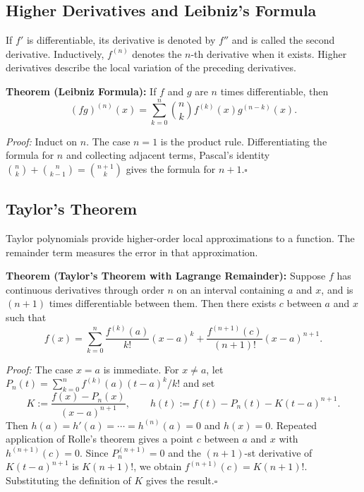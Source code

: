 \documentclass[a4paper,11pt,abstracton]{scrartcl}
\theoremstyle{dotlessP}
\theoremstyle{dotlessS}
\theoremstyle{remark}
\theoremstyle{definition}
\begin{document}
\subsection{Higher Derivatives and Leibniz's Formula}

If $f'$ is differentiable, its derivative is denoted by $f''$ and is
called the second derivative. Inductively, $f^{(n)}$ denotes the
$n$-th derivative when it exists. Higher derivatives describe the
local variation of the preceding derivatives.

\begin{problem_box}
\textbf{Theorem (Leibniz Formula):} If $f$ and $g$ are $n$ times
differentiable, then
\[
 (fg)^{(n)}(x)=\sum_{k=0}^n\binom nk
 f^{(k)}(x)g^{(n-k)}(x).
\]
\end{problem_box}

\begin{claim_box}
\textit{Proof:} Induct on $n$. The case $n=1$ is the product rule.
Differentiating the formula for $n$ and collecting adjacent terms,
Pascal's identity
$\binom nk+\binom n{k-1}=\binom{n+1}k$ gives the formula for
$n+1$.\hfill$\square$
\end{claim_box}

\subsection{Taylor's Theorem}

Taylor polynomials provide higher-order local approximations to a
function. The remainder term measures the error in that approximation.

\begin{problem_box}
\textbf{Theorem (Taylor's Theorem with Lagrange Remainder):}
Suppose $f$ has continuous derivatives through order $n$ on an
interval containing $a$ and $x$, and is $(n+1)$ times differentiable
between them. Then there exists $c$ between $a$ and $x$ such that
\[
 f(x)=\sum_{k=0}^{n}\frac{f^{(k)}(a)}{k!}(x-a)^k
 +\frac{f^{(n+1)}(c)}{(n+1)!}(x-a)^{n+1}.
\]
\end{problem_box}

\begin{claim_box}
\textit{Proof:} The case $x=a$ is immediate. For $x\ne a$, let
$P_n(t)=\sum_{k=0}^n f^{(k)}(a)(t-a)^k/k!$ and set
\[
 K:=\frac{f(x)-P_n(x)}{(x-a)^{n+1}},\qquad
 h(t):=f(t)-P_n(t)-K(t-a)^{n+1}.
\]
Then $h(a)=h'(a)=\cdots=h^{(n)}(a)=0$ and $h(x)=0$.
Repeated application of Rolle's theorem gives a point $c$ between
$a$ and $x$ with $h^{(n+1)}(c)=0$. Since
$P_n^{(n+1)}=0$ and the $(n+1)$-st derivative of
$K(t-a)^{n+1}$ is $K(n+1)!$, we obtain
$f^{(n+1)}(c)=K(n+1)!$. Substituting the definition of $K$
gives the result.\hfill$\square$
\end{claim_box}
\end{document}
